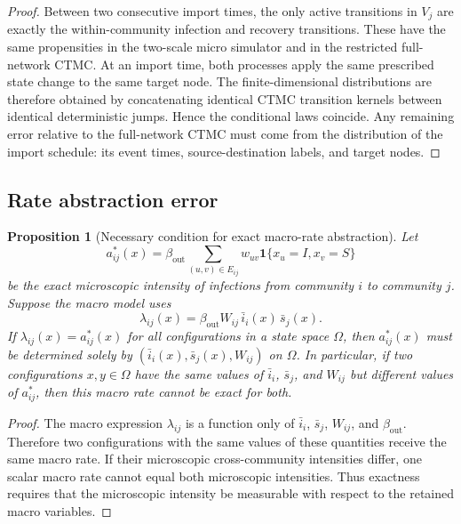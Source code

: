 \documentclass[12pt,a4paper]{article}
\newtheorem{proposition}{Proposition}
\theoremstyle{definition}
\newcommand{\1}{\mathbf{1}}
\begin{document}
\begin{proof}
Between two consecutive import times, the only active transitions in $V_j$ are exactly the within-community infection and recovery transitions.  These have the same propensities in the two-scale micro simulator and in the restricted full-network CTMC.  At an import time, both processes apply the same prescribed state change to the same target node.  The finite-dimensional distributions are therefore obtained by concatenating identical CTMC transition kernels between identical deterministic jumps.  Hence the conditional laws coincide.  Any remaining error relative to the full-network CTMC must come from the distribution of the import schedule: its event times, source-destination labels, and target nodes.
\end{proof}

\subsection{Rate abstraction error}

\begin{proposition}[Necessary condition for exact macro-rate abstraction]
Let
\begin{equation}
    a_{ij}^*(x)=\beta_{\mathrm{out}}\sum_{(u,v)\in E_{ij}} w_{uv}\1\{x_u=I,x_v=S\}
\end{equation}
be the exact microscopic intensity of infections from community $i$ to community $j$.  Suppose the macro model uses
\begin{equation}
    \lambda_{ij}(x)=\beta_{\mathrm{out}}W_{ij}\,\bar i_i(x)\,\bar s_j(x).
\end{equation}
If $\lambda_{ij}(x)=a_{ij}^*(x)$ for all configurations in a state space $\Omega$, then $a_{ij}^*(x)$ must be determined solely by $(\bar i_i(x),\bar s_j(x),W_{ij})$ on $\Omega$.  In particular, if two configurations $x,y\in\Omega$ have the same values of $\bar i_i$, $\bar s_j$, and $W_{ij}$ but different values of $a_{ij}^*$, then this macro rate cannot be exact for both.
\end{proposition}

\begin{proof}
The macro expression $\lambda_{ij}$ is a function only of $\bar i_i$, $\bar s_j$, $W_{ij}$, and $\beta_{\mathrm{out}}$.  Therefore two configurations with the same values of these quantities receive the same macro rate.  If their microscopic cross-community intensities differ, one scalar macro rate cannot equal both microscopic intensities.  Thus exactness requires that the microscopic intensity be measurable with respect to the retained macro variables.
\end{proof}
\end{document}
